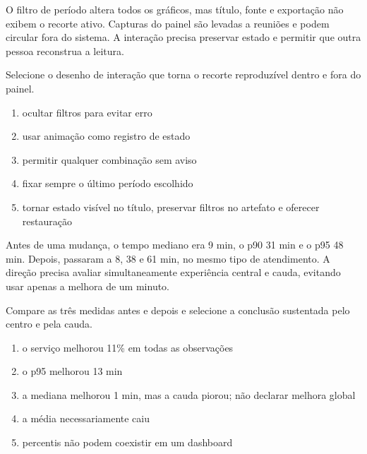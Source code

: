
\TextoBase

O filtro de período altera todos os gráficos, mas título, fonte e exportação não exibem o recorte ativo. Capturas do painel são levadas a reuniões e podem circular fora do sistema. A interação precisa preservar estado e permitir que outra pessoa reconstrua a leitura.

\FonteDidatica

\Comando Selecione o desenho de interação que torna o recorte reproduzível dentro e fora do painel.

\begin{enumerate}[label=\Alph*)]

\item ocultar filtros para evitar erro

\item usar animação como registro de estado

\item permitir qualquer combinação sem aviso

\item fixar sempre o último período escolhido

\item tornar estado visível no título, preservar filtros no artefato e oferecer restauração

\end{enumerate}


\TextoBase

Antes de uma mudança, o tempo mediano era 9 min, o p90 31 min e o p95 48 min. Depois, passaram a 8, 38 e 61 min, no mesmo tipo de atendimento. A direção precisa avaliar simultaneamente experiência central e cauda, evitando usar apenas a melhora de um minuto.

\FonteDidatica

\Comando Compare as três medidas antes e depois e selecione a conclusão sustentada pelo centro e pela cauda.

\begin{enumerate}[label=\Alph*)]

\item o serviço melhorou 11\% em todas as observações

\item o p95 melhorou 13 min

\item a mediana melhorou 1 min, mas a cauda piorou; não declarar melhora global

\item a média necessariamente caiu

\item percentis não podem coexistir em um dashboard

\end{enumerate}

